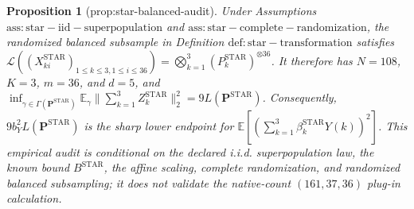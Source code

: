 \documentclass{article}
\newtheorem{proposition}{Proposition}
\begin{document}
\begin{proposition}[prop:star-balanced-audit]\label{prop:star-balanced-audit}
Under Assumptions \(\mathrm{ass:star-iid-superpopulation}\) and \(\mathrm{ass:star-complete-randomization}\), the randomized balanced subsample in Definition \(\mathrm{def:star-transformation}\) satisfies \(\mathcal L((X_{ki}^{\mathrm{STAR}})_{1\le k\le3,1\le i\le36})=\bigotimes_{k=1}^3(P_k^{\mathrm{STAR}})^{\otimes36}\). It therefore has \(N=108\), \(K=3\), \(m=36\), and \(d=5\), and \(\inf_{\gamma\in\Gamma(\mathbf P^{\mathrm{STAR}})}\mathbb E_\gamma\|\sum_{k=1}^3Z_k^{\mathrm{STAR}}\|_2^2=9L(\mathbf P^{\mathrm{STAR}})\). Consequently, \(9b_Y^2L(\mathbf P^{\mathrm{STAR}})\) is the sharp lower endpoint for \(\mathbb E[(\sum_{k=1}^3\beta_k^{\mathrm{STAR}}Y(k))^2]\). This empirical audit is conditional on the declared i.i.d. superpopulation law, the known bound \(B^{\mathrm{STAR}}\), the affine scaling, complete randomization, and randomized balanced subsampling; it does not validate the native-count \((161,37,36)\) plug-in calculation.
\end{proposition}
\end{document}
